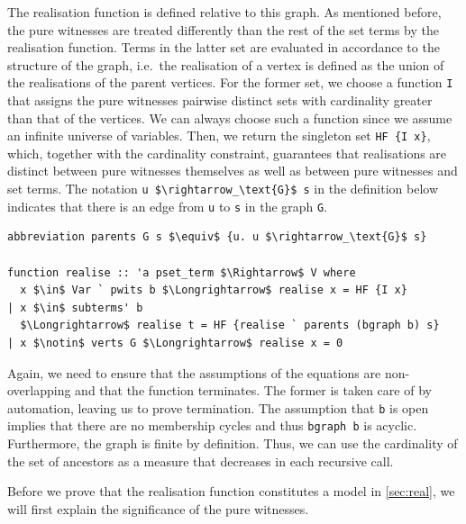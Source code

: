 \documentclass[runningheads]{llncs}
\begin{document}
The realisation function is defined relative to this graph.
As mentioned before, the pure witnesses are treated differently than the rest of the set terms by the realisation function.
Terms in the latter set are evaluated in accordance to the structure of the graph, i.e.\ the realisation of a vertex is defined as the union of the realisations of the parent vertices. 
For the former set, we choose a function \lstinline!I! that assigns the pure witnesses pairwise distinct sets with cardinality greater than that of the vertices.
We can always choose such a function since we assume an infinite universe of variables.
Then, we return the singleton set \lstinline!HF {I x}!, which, together with the cardinality constraint, guarantees that realisations are distinct between pure witnesses themselves as well as between pure witnesses and set terms.  
The notation \lstinline!u $\rightarrow_\text{G}$ s! in the definition below indicates that there is an edge from \lstinline!u! to \lstinline!s! in the graph \lstinline!G!.
\begin{lstlisting}
abbreviation parents G s $\equiv$ {u. u $\rightarrow_\text{G}$ s}

function realise :: 'a pset_term $\Rightarrow$ V where
  x $\in$ Var ` pwits b $\Longrightarrow$ realise x = HF {I x}
| x $\in$ subterms' b
  $\Longrightarrow$ realise t = HF {realise ` parents (bgraph b) s}
| x $\notin$ verts G $\Longrightarrow$ realise x = 0
\end{lstlisting}

Again, we need to ensure that the assumptions of the equations are non-overlapping and that the function terminates.
The former is taken care of by automation, leaving us to prove termination.
The assumption that \lstinline!b! is open implies that there are no membership cycles and thus \lstinline!bgraph b! is acyclic.
Furthermore, the graph is finite by definition.
Thus, we can use the cardinality of the set of ancestors as a measure that decreases in each recursive call.

Before we prove that the realisation function constitutes a model in \cref{sec:real}, we will first explain the significance of the pure witnesses.
\end{document}
